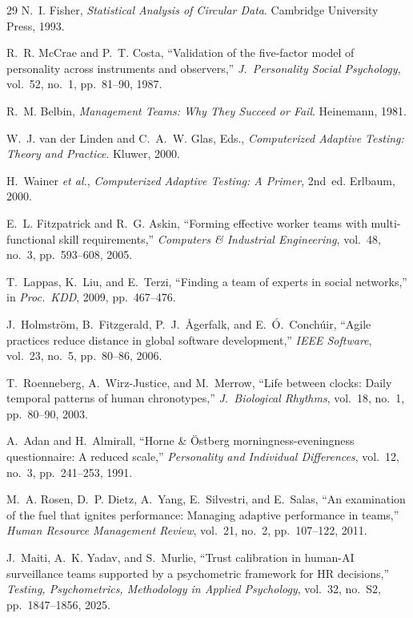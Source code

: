 \documentclass[conference]{IEEEtran}
\begin{document}
\begin{thebibliography}{29}
N.~I. Fisher, \textit{Statistical Analysis of Circular Data}.
Cambridge University Press, 1993.

R.~R. McCrae and P.~T. Costa, ``Validation of the five-factor model
of personality across instruments and observers,'' \textit{J.\
Personality Social Psychology}, vol.~52, no.~1, pp.~81--90, 1987.

R.~M. Belbin, \textit{Management Teams: Why They Succeed or Fail}.
Heinemann, 1981.

W.~J. van der Linden and C.~A.~W. Glas, Eds., \textit{Computerized
Adaptive Testing: Theory and Practice}. Kluwer, 2000.

H.~Wainer \textit{et al.}, \textit{Computerized Adaptive Testing: A
Primer}, 2nd~ed. Erlbaum, 2000.

E.~L. Fitzpatrick and R.~G. Askin, ``Forming effective worker teams
with multi-functional skill requirements,'' \textit{Computers \&
Industrial Engineering}, vol.~48, no.~3, pp.~593--608, 2005.

T.~Lappas, K.~Liu, and E.~Terzi, ``Finding a team of experts in
social networks,'' in \textit{Proc.\ KDD}, 2009, pp.~467--476.

J.~Holmstr\"{o}m, B.~Fitzgerald, P.~J.~\r{A}gerfalk, and
E.~\'{O}.~Conch\'{u}ir, ``Agile practices reduce distance in global
software development,'' \textit{IEEE Software}, vol.~23, no.~5,
pp.~80--86, 2006.

T.~Roenneberg, A.~Wirz-Justice, and M.~Merrow, ``Life between
clocks: Daily temporal patterns of human chronotypes,'' \textit{J.\
Biological Rhythms}, vol.~18, no.~1, pp.~80--90, 2003.

A.~Adan and H.~Almirall, ``Horne \& \"{O}stberg
morningness-eveningness questionnaire: A reduced scale,''
\textit{Personality and Individual Differences}, vol.~12, no.~3,
pp.~241--253, 1991.

M.~A. Rosen, D.~P. Dietz, A.~Yang, E.~Silvestri, and E.~Salas,
``An examination of the fuel that ignites performance: Managing
adaptive performance in teams,''
\textit{Human Resource Management Review},
vol.~21, no.~2, pp.~107--122, 2011.

J.~Maiti, A.~K. Yadav, and S.~Murlie,
``Trust calibration in human-AI surveillance teams supported by a
psychometric framework for HR decisions,''
\textit{Testing, Psychometrics, Methodology in Applied Psychology},
vol.~32, no.~S2, pp.~1847--1856, 2025.


\end{thebibliography}
\end{document}
